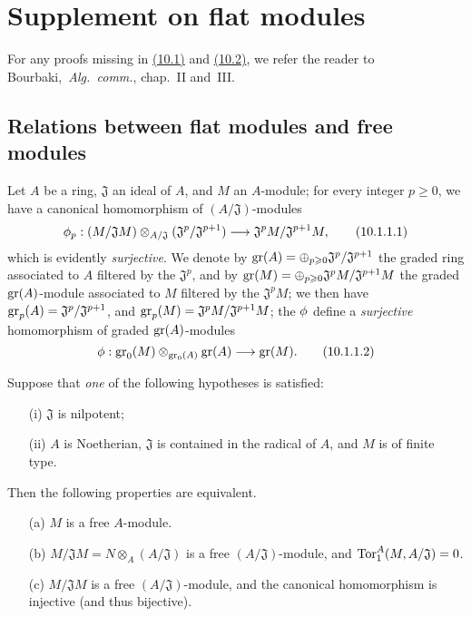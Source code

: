 \section{Supplement on flat modules}
\label{section:0.10}

For any proofs missing in \hyperref[subsection:0.10.1]{(10.1)} and \hyperref[subsection:0.10.2]{(10.2)}, we refer the reader to Bourbaki,~\emph{Alg.~comm.}, chap.~II and~III.

\subsection{Relations between flat modules and free modules}
\label{subsection:0.10.1}

\begin{env}[10.1.1]
\label{0.10.1.1}
Let $A$ be a ring, $\mathfrak{J}$ an ideal of $A$, and $M$ an $A$-module;
for every integer $p\geq0$, we have a canonical homomorphism of $(A/\mathfrak{J})$-modules
\[
\label{0.10.1.1.1}
  \vphi_p:(M/\mathfrak{J}M)\otimes_{A/\mathfrak{J}}(\mathfrak{J}^p/\mathfrak{J}^{p+1})\to\mathfrak{J}^pM/\mathfrak{J}^{p+1}M,
  \tag{10.1.1.1}
\]
which is evidently \emph{surjective}.
We denote by $\operatorname{gr}(A)=\oplus_{p\geqslant0}\mathfrak{J}^p/\mathfrak{J}^{p+1}$ the graded ring associated to $A$ filtered by the $\mathfrak{J}^p$, and by $\operatorname{gr}(M)=\oplus_{p\geqslant0}\mathfrak{J}^pM/\mathfrak{J}^{p+1}M$ the graded $\operatorname{gr}(A)$-module associated to $M$ filtered by the $\mathfrak{J}^pM$;
we then have $\operatorname{gr}_p(A)=\mathfrak{J}^p/\mathfrak{J}^{p+1}$, and $\operatorname{gr}_p(M)=\mathfrak{J}^pM/\mathfrak{J}^{p+1}M$;
the $\phi$ define a \emph{surjective} homomorphism of graded $\operatorname{gr}(A)$-modules
\[
\label{0.10.1.1.2}
  \vphi:\gr_0(M)\otimes_{\gr_0(A)}\gr(A)\to\gr(M).
  \tag{10.1.1.2}
\]
\end{env}

\begin{env}[10.1.2]
\label{0.10.1.2}
Suppose that \emph{one} of the following hypotheses is satisfied:
\begin{enumerate}
  \item[(i)] $\mathfrak{J}$ is nilpotent;
  \item[(ii)] $A$ is Noetherian, $\mathfrak{J}$ is contained in the radical of $A$, and $M$ is of finite type.
\end{enumerate}
Then the following properties are equivalent.
\begin{enumerate}
  \item[(a)] $M$ is a free $A$-module.
  \item[(b)] $M/\mathfrak{J}M=N\otimes_A(A/\mathfrak{J})$ is a free $(A/\mathfrak{J})$-module, and $\operatorname{Tor}_1^A(M,A/\mathfrak{J})=0$.
  \item[(c)] $M/\mathfrak{J}M$ is a free $(A/\mathfrak{J})$-module, and the canonical homomorphism  is injective (and thus bijective).
\end{enumerate}
\end{env}

